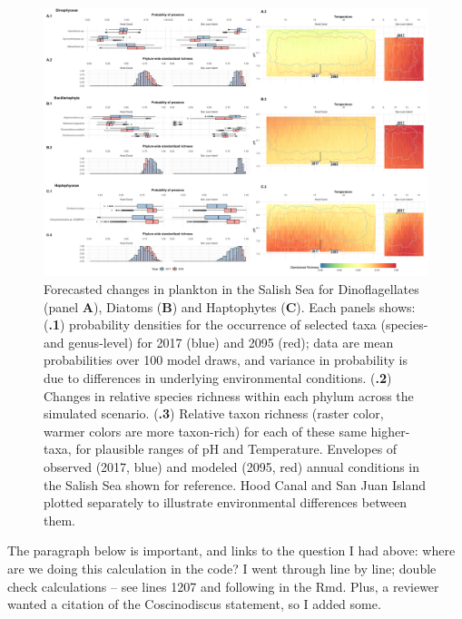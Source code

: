 \documentclass[11pt]{article}
\begin{document}
\begin{linenumbers}
 \begin{figure}
 \centering
 \includegraphics[width=1\linewidth]{Figures_for_MS/Top_fig3_2020-09-03.Other.sel.png}
\caption{\footnotesize{Forecasted changes in plankton in the Salish Sea {\color{red} for Dinoflagellates (panel \textbf{A}), Diatoms (\textbf{B}) and Haptophytes (\textbf{C}). Each panels shows:  (\textbf{.1}) probability densities for the occurrence of selected taxa (species- and genus-level) for 2017 (blue) and 2095 (red); data are mean probabilities over 100 model draws, and variance in probability is due to differences in underlying environmental conditions.  (\textbf{.2}) Changes in relative species richness within each phylum across the simulated scenario. (\textbf{.3}) Relative taxon richness (raster color, warmer colors are more taxon-rich) for each of these same higher-taxa, for plausible ranges of pH and Temperature. Envelopes of observed (2017, blue) and modeled (2095, red) annual conditions in the Salish Sea shown for reference. Hood Canal and San Juan Island plotted separately to illustrate environmental differences between them.}}}

\label{fig:Fig3}
 \end{figure}
 
 
{\color{blue} The paragraph below is important, and links to the question I had above: where are we doing this calculation in the code? I went through line by line; double check calculations -- see lines 1207 and following in the Rmd. Plus, a reviewer wanted a citation of the Coscinodiscus statement, so I added some.} 


\end{linenumbers}
\end{document}
